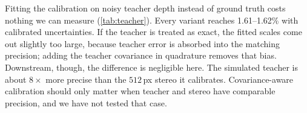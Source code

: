 Fitting the calibration on noisy teacher depth instead of ground truth costs nothing we can measure
(\cref{tab:teacher}). Every variant reaches 1.61--1.62\% with calibrated uncertainties. If the teacher
is treated as exact, the fitted scales come out slightly too large, because teacher error is absorbed
into the matching precision; adding the teacher covariance in quadrature removes that bias.
Downstream, though, the difference is negligible here. The simulated teacher is about $8\times$ more
precise than the $512$\,px stereo it calibrates. Covariance-aware calibration should only matter when
teacher and stereo have comparable precision, and we have not tested that case.
